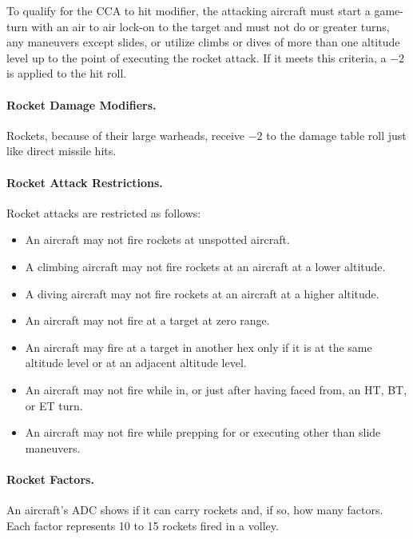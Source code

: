 \begin{advancedrules}
{To qualify for the CCA to hit modifier, the attacking aircraft must start a game-turn with an air to air lock-on to the target and must not do  or greater turns, any maneuvers except slides, or utilize climbs or dives of more than one altitude level up to the point of executing the rocket attack. If it meets this criteria, a $-2$ is applied to the hit roll.

\paragraph{Rocket Damage Modifiers.} Rockets, because of their large warheads, receive $-2$ to the damage table roll just like direct missile hits.

\paragraph{Rocket Attack Restrictions.} Rocket attacks are restricted as follows:

\begin{itemize}

    \item An aircraft may not fire rockets at unspotted aircraft.

    \item A climbing aircraft may not fire rockets at an aircraft at a lower altitude.

    \item A diving aircraft may not fire rockets at an aircraft at a higher altitude.

    \item An aircraft may not fire at a target at zero range.

    \item An aircraft  may fire at a target in another hex only if it is at the same altitude level or at an adjacent altitude level.

    \item An aircraft may not fire while in, or just after having faced from, an HT, BT, or ET turn.

    \item An aircraft may not fire while prepping for or executing other than slide maneuvers.

\end{itemize}

}{
\paragraph{Rocket Factors.} An aircraft's ADC shows if it can carry rockets and, if so, how many factors. Each factor represents 10 to 15 rockets fired in a volley.

}
\end{advancedrules}
